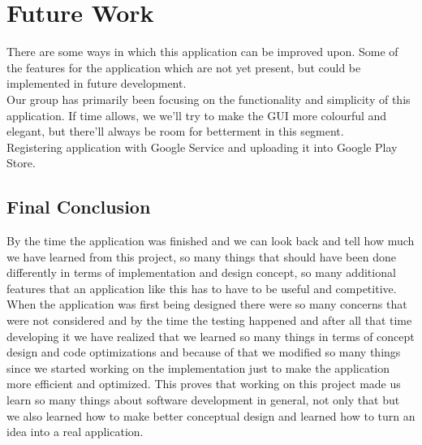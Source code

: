 \section{Future Work}






There are some ways in which this application can be improved upon. Some of the features for the application which are not yet present, but could be implemented in future development.\\

Our group has primarily been focusing on the functionality and simplicity of this application. If time allows, we we'll try to make the GUI more colourful and elegant, but there'll always be room for betterment in this segment.\\

Registering application with Google Service and uploading it into Google Play Store.

\begin{center}
    \section*{\huge{Final Conclusion}}
\end{center}

By the time the application was finished and we can look back and tell how much we have learned from this project, so many things that should have been done differently in terms of implementation and design concept, so many additional features that an application like this has to have to be useful and competitive. \\

When the application was first being designed there were so many concerns that were not considered and by the time the testing happened and after all that time developing it we have realized that we learned so many things in terms of concept design and code optimizations and because of that we modified so many things since we started working on the implementation just to make the application more efficient and optimized. This proves that working on this project made us learn so many things about software development in general, not only that but we also learned how to make better conceptual design and learned how to turn an idea into a real application.\\

